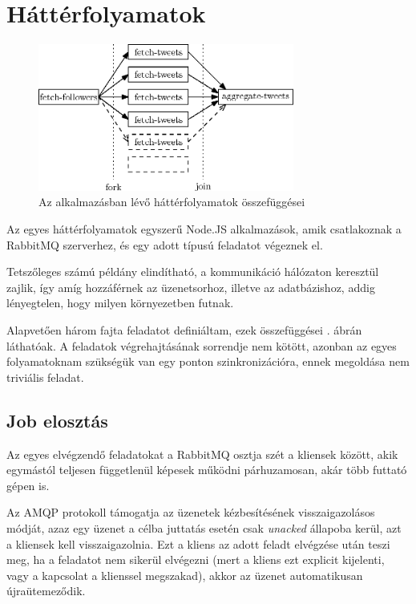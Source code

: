 \section{Háttérfolyamatok}

\begin{figure}[h!]
  \centering
  \includegraphics[width=0.75\textwidth]{figures/workflow}
  \caption{Az alkalmazásban lévő háttérfolyamatok összefüggései}
  \label{fig:workflow}
\end{figure}

Az egyes háttérfolyamatok egyszerű Node.JS alkalmazások, amik csatlakoznak
a RabbitMQ szerverhez, és egy adott típusú feladatot végeznek el.

Tetszőleges számú példány elindítható, a kommunikáció hálózaton keresztül
zajlik, így amíg hozzáférnek az üzenetsorhoz, illetve az adatbázishoz,
addig lényegtelen, hogy milyen környezetben futnak.

Alapvetően három fajta feladatot definiáltam, ezek összefüggései
. ábrán láthatóak. A feladatok végrehajtásának sorrendje
nem kötött, azonban az egyes folyamatoknam szükségük van egy ponton
szinkronizációra, ennek megoldása nem triviális feladat.

\subsection{Job elosztás}

Az egyes elvégzendő feladatokat a RabbitMQ osztja szét a kliensek között,
akik egymástól teljesen függetlenül képesek működni párhuzamosan,
akár több futtató gépen is.

Az AMQP protokoll támogatja az üzenetek kézbesítésének visszaigazolásos módját,
azaz egy üzenet a célba juttatás esetén csak \emph{unacked} állapoba kerül,
azt a kliensek kell visszaigazolnia. Ezt a kliens az adott feladt elvégzése
után teszi meg, ha a feladatot nem sikerül elvégezni (mert a kliens ezt
explicit kijelenti, vagy a kapcsolat a klienssel megszakad), akkor
az üzenet automatikusan újraütemeződik.

